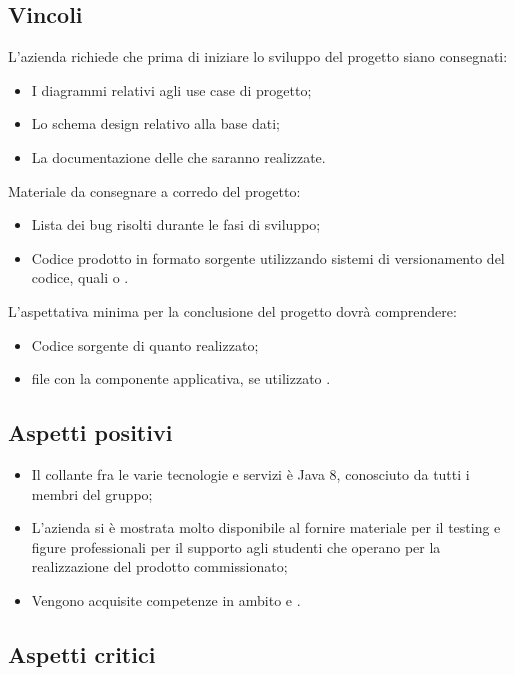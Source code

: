 \subsection{Vincoli}
L'azienda richiede che prima di iniziare lo sviluppo del progetto siano consegnati:
\begin{itemize}
\item I diagrammi  relativi agli use case di progetto;
\item Lo schema design relativo alla base dati;
\item La documentazione delle  che saranno realizzate. 
\end{itemize}
Materiale da consegnare a corredo del progetto: 
\begin{itemize}
\item Lista dei bug risolti durante le fasi di sviluppo;
\item Codice prodotto in formato sorgente utilizzando sistemi di versionamento del codice, quali  o .
\end{itemize}
L'aspettativa minima per la conclusione del progetto dovrà comprendere: 
\begin{itemize}
\item Codice sorgente di quanto realizzato;
\item {} file con la componente applicativa, se utilizzato .
\end{itemize}

\subsection{Aspetti positivi}
\begin{itemize}
\item Il collante fra le varie tecnologie e servizi è Java 8, conosciuto da tutti i membri del gruppo;
\item L'azienda si \`e mostrata molto disponibile al fornire materiale per il testing e figure professionali per il supporto agli studenti che operano per la realizzazione del prodotto commissionato;
\item Vengono acquisite competenze in ambito  e .
\end{itemize}

\subsection{Aspetti critici}

